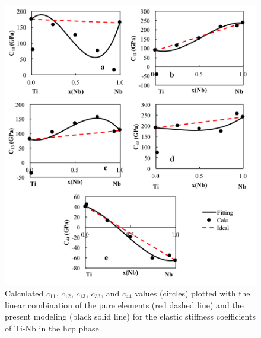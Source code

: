 \pagebreak
\begin{figure}[H]
	\centering
	\includegraphics[width=\textwidth]{Chapter-7/Figures/hcpe1.png}
	\caption{Calculated $c_{11}$, $c_{12}$, $c_{13}$, $c_{33}$, and $c_{44}$ values (circles) plotted with the linear combination of the pure elements (red dashed line) and the present modeling (black solid line) for the elastic stiffness coefficients of Ti-Nb in the hcp phase.}
	\label{Ch7-figure:hcpe1}
\end{figure}

